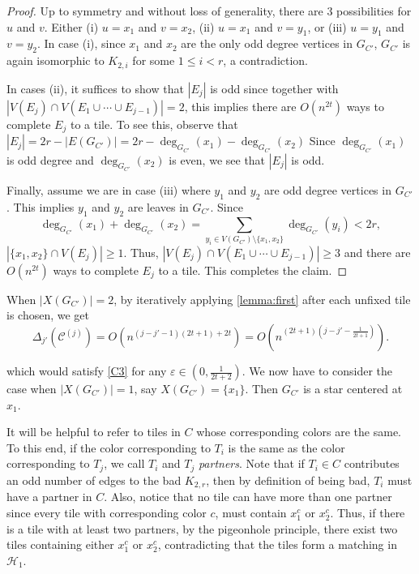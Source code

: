 \documentclass{article}
\theoremstyle{definition}
\begin{document}
\begin{proof}
Up to symmetry and without loss of generality, there are $3$ possibilities for $u$ and $v$. Either (i) $u=x_1$ and $v=x_2$, (ii) $u= x_1$ and $v=y_1$, or (iii) $u=y_1$ and $v=y_2$. In case (i), since $x_1$ and $x_2$ are the only odd degree vertices in $G_{C'}$, $G_{C'}$ is again isomorphic to $K_{2,i}$ for some $1\leq i < r$, a contradiction. 

In cases (ii), it suffices to show that $|E_j|$ is odd since together with $|V(E_j)\cap V(E_1 \cup \cdots \cup E_{j-1})|=2$, this implies there are $O(n^{2t})$ ways to complete $E_j$ to a tile. To see this, observe that  $|E_j|= 2r-|E(G_{C'})| = 2r - \deg_{G_{C'}}(x_1)- \deg_{G_{C'}}(x_2)$ Since $\deg_{G_{C'}}(x_1)$ is odd degree and $\deg_{G_{C'}}(x_2)$ is even, we see that $|E_j|$ is odd.

Finally, assume we are in case (iii) where $y_1$ and $y_2$ are odd degree vertices in $G_{C'}$. This implies $y_1$ and $y_2$ are leaves in $G_{C'}$. Since \[\deg_{G_{C'}}(x_1)+\deg_{G_{C'}}(x_2) = \sum_{y_i \in V(G_{C'})\setminus \{x_1,x_2\}}\deg_{G_{C'}}(y_i) < 2r,\] $|\{x_1,x_2\}\cap V(E_j)|\geq 1$. Thus, $|V(E_j)\cap V(E_1\cup \cdots \cup E_{j-1})|\geq 3$ and there are $O(n^{2t})$ ways to complete $E_j$ to a tile. This completes the claim.
\end{proof}

When $|X(G_{C'})|=2$,  by iteratively applying \cref{lemma:first} after each unfixed tile is chosen, we get \[\Delta_{j'}(\mathcal{C}^{(j)}) = O\left(n^{(j-j'-1)(2t+1)+2t}\right) = O\left(n^{(2t+1)(j-j'-\frac{1}{2t+1})}\right).\]

which would satisfy \ref{C3} for any $\varepsilon\in \left(0,\frac{1}{2t+2} \right)$. We now have to consider the case when $|X(G_{C'})|=1$, say $X(G_{C'})=\{x_1\}$. Then $G_{C'}$ is a star centered at $x_1$.


It will be helpful to refer to tiles in $C$ whose corresponding colors are the same. To this end, if the color corresponding to $T_i$ is the same as the color corresponding to $T_j$, we call $T_i$ and $T_j$ \textit{partners}. Note that if $T_i\in C$ contributes an odd number of edges to the bad $K_{2,r}$, then by definition of being bad, $T_i$ must have a partner in $C$. Also, notice that no tile can have more than one partner since every tile with corresponding color $c$, must contain $x_1^c$ or $x_2^c$. Thus, if there is a tile with at least two partners, by the pigeonhole principle, there exist two tiles containing either $x_1^c$ or $x_2^c$, contradicting that the tiles form a matching in $\mathcal{H}_1$.
\end{document}
